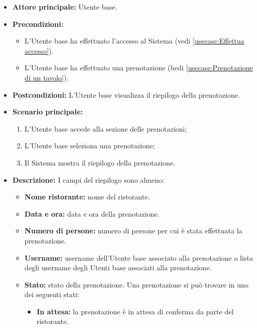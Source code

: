 \label{usecase:Visualizzazione del riepilogo prenotazione}
\begin{itemize}
	\item \textbf{Attore principale:} Utente base.

	\item \textbf{Precondizioni:}
	\begin{itemize}
		\item L'Utente base ha effettuato l'accesso al Sistema (vedi \autoref{usecase:Effettua accesso}).
		\item L'Utente base ha effettuato una prenotazione (bedi \autoref{usecase:Prenotazione di un tavolo}).
	\end{itemize}


	\item \textbf{Postcondizioni:}
	      L'Utente base visualizza il riepilogo della prenotazione.

	\item \textbf{Scenario principale:}
	      \begin{enumerate}
		      \item L'Utente base accede alla sezione delle prenotazioni;
		      \item L'Utente base seleziona una prenotazione;
		      \item Il Sistema mostra il riepilogo della prenotazione.
	      \end{enumerate}

	\item \textbf{Descrizione:}
	      I campi del riepilogo sono almeno:
	      \begin{itemize}
		      \item \textbf{Nome ristorante:} nome del ristorante.
		      \item \textbf{Data e ora:} data e ora della prenotazione.
		      \item \textbf{Numero di persone:} numero di persone per cui è
		            stata effettuata la prenotazione.
		      \item \textbf{Username:} username dell'Utente base
		            associato alla prenotazione o lista degli username degli
		            Utenti base associati alla prenotazione.

		      \item \textbf{Stato:} stato della prenotazione. Una
		            prenotazione si può trovare in uno dei seguenti stati:
		            \begin{itemize}
			            \item \textbf{In attesa:} la prenotazione è
			                  in attesa di conferma da parte del ristorante.


\end{itemize}
\end{itemize}
\end{itemize}

